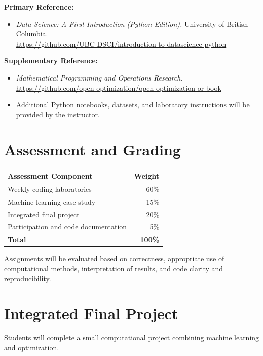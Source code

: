 \documentclass[11pt]{article}
\begin{document}
\textbf{Primary Reference:}

\begin{itemize}[leftmargin=*, nosep]
\item \emph{Data Science: A First Introduction (Python Edition).}
      University of British Columbia.\\
      \url{https://github.com/UBC-DSCI/introduction-to-datascience-python}
\end{itemize}

\textbf{Supplementary Reference:}

\begin{itemize}[leftmargin=*, nosep]
\item \emph{Mathematical Programming and Operations Research.}\\
      \url{https://github.com/open-optimization/open-optimization-or-book}
\item Additional Python notebooks, datasets, and laboratory
      instructions will be provided by the instructor.
\end{itemize}

\section*{Assessment and Grading}

\begin{center}
\begin{tabular}{lr}
\hline
\textbf{Assessment Component} & \textbf{Weight} \\
\hline
Weekly coding laboratories & 60\% \\
Machine learning case study & 15\% \\
Integrated final project & 20\% \\
Participation and code documentation & 5\% \\
\hline
\textbf{Total} & \textbf{100\%} \\
\hline
\end{tabular}
\end{center}

Assignments will be evaluated based on correctness,
appropriate use of computational methods, interpretation
of results, and code clarity and reproducibility.

\section*{Integrated Final Project}

Students will complete a small computational project
combining machine learning and optimization.
\end{document}
